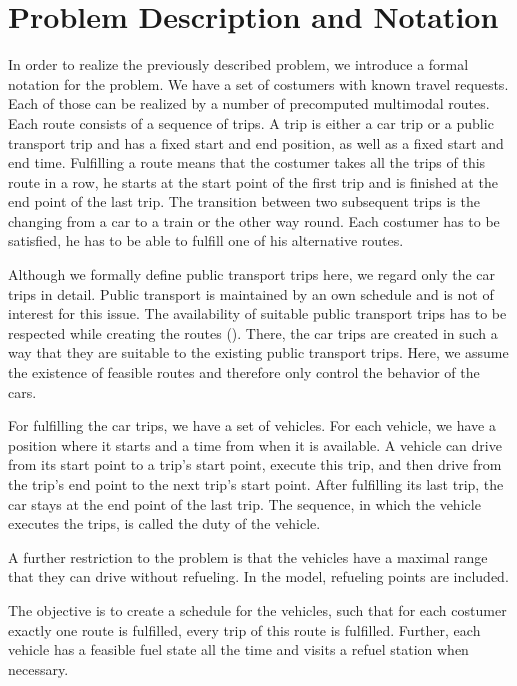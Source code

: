 \section{Problem Description and Notation}
\label{sec:problem_description}

In order to realize the previously described problem, we introduce a formal notation for the problem. We have a set of costumers with known travel requests. Each of those can be realized by a number of precomputed multimodal routes. Each route consists of a sequence of trips. A trip is either a car trip or a public transport trip and has a fixed start and end position, as well as a fixed start and end time. Fulfilling a route means that the costumer takes all the trips of this route in a row, \ie he starts at the start point of the first trip and is finished at the end point of the last trip. The transition between two subsequent trips is the changing from a car to a train or the other way round. Each costumer has to be satisfied, \ie he has to be able to fulfill one of his alternative routes.

Although we formally define public transport trips here, we regard only the car trips in detail. Public transport is maintained by an own schedule and is not of interest for this issue. The availability of suitable public transport trips has to be respected while creating the routes (). There, the car trips are created in such a way that they are suitable to the existing public transport trips. Here, we assume the existence of feasible routes and therefore only control the behavior of the cars.

For fulfilling the car trips, we have a set of vehicles. For each vehicle, we have a position where it starts and a time from when it is available. A vehicle can drive from its start point to a trip's start point, execute this trip, and then drive from the trip's end point to the next trip's start point. After fulfilling its last trip, the car stays at the end point of the last trip. The sequence, in which the vehicle executes the trips, is called the duty of the vehicle. 

A further restriction to the problem is that the vehicles have a maximal range that they can drive without refueling. In the model, refueling points are included.

The objective is to create a schedule for the vehicles, such that for each costumer exactly one route is fulfilled, \ie every trip of this route is fulfilled. Further, each vehicle has a feasible fuel state all the time and visits a refuel station when necessary.

